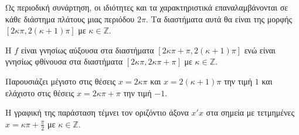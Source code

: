 \documentclass[12pt,landscape]{article}
\begin{document}
\begin{multicols}{3}
\begin{center}
\end{center}
\begin{alist}[resume]
\item Ως περιοδική συνάρτηση, οι ιδιότητες και τα χαρακτηριστικά επαναλαμβάνονται σε κάθε διάστημα πλάτους μιας περιόδου $ 2\pi $. Τα διαστήματα αυτά θα είναι της μορφής $ [2\kappa\pi,2\left( \kappa+1\right)\pi] $ με $ \kappa\in\mathbb{Z} $.
\item Η $ f $ είναι γνησίως αύξουσα στα διαστήματα $ \left[2\kappa\pi+\pi,2(\kappa+1)\pi\right]$ ενώ είναι γνησίως φθίνουσα στα διαστήματα $ \left[2\kappa\pi, 2\kappa\pi+\pi \right]  $ με $ \kappa\in\mathbb{Z} $.
\item Παρουσιάζει μέγιστο στις θέσεις $ x=2\kappa\pi $ και $ x=2(\kappa+1)\pi $ την τιμή $ 1 $ και ελάχιστο στις θέσεις $ x=2\kappa\pi+\pi $ την τιμή $ -1 $.
\item Η γραφική της παράσταση τέμνει τον οριζόντιο άξονα $ x'x $ στα σημεία με τετμημένες $ x=\kappa\pi+\frac{\pi}{2} $ με $ \kappa\in\mathbb{Z} $.
\end{alist}
\end{multicols}
\end{document}
